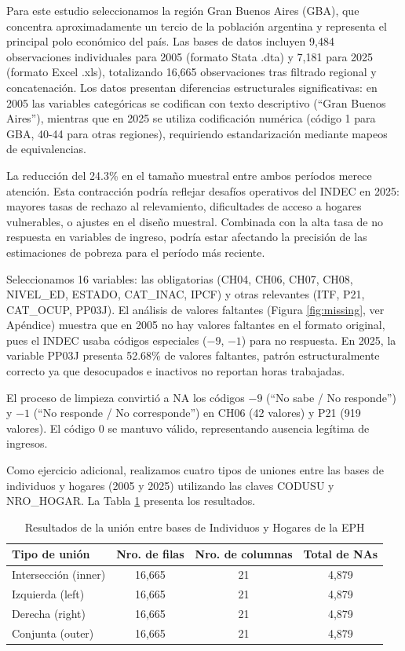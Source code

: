\documentclass[11pt,a4paper]{article}
\begin{document}
Para este estudio seleccionamos la región Gran Buenos Aires (GBA), que concentra aproximadamente un tercio de la población argentina y representa el principal polo económico del país. Las bases de datos incluyen 9,484 observaciones individuales para 2005 (formato Stata .dta) y 7,181 para 2025 (formato Excel .xls), totalizando 16,665 observaciones tras filtrado regional y concatenación. Los datos presentan diferencias estructurales significativas: en 2005 las variables categóricas se codifican con texto descriptivo (``Gran Buenos Aires''), mientras que en 2025 se utiliza codificación numérica (código 1 para GBA, 40-44 para otras regiones), requiriendo estandarización mediante mapeos de equivalencias.

La reducción del 24.3\% en el tamaño muestral entre ambos períodos merece atención. Esta contracción podría reflejar desafíos operativos del INDEC en 2025: mayores tasas de rechazo al relevamiento, dificultades de acceso a hogares vulnerables, o ajustes en el diseño muestral. Combinada con la alta tasa de no respuesta en variables de ingreso, podría estar afectando la precisión de las estimaciones de pobreza para el período más reciente.

Seleccionamos 16 variables: las obligatorias (CH04, CH06, CH07, CH08, NIVEL\_ED, ESTADO, CAT\_INAC, IPCF) y otras relevantes (ITF, P21, CAT\_OCUP, PP03J). El análisis de valores faltantes (Figura \ref{fig:missing}, ver Apéndice) muestra que en 2005 no hay valores faltantes en el formato original, pues el INDEC usaba códigos especiales ($-9$, $-1$) para no respuesta. En 2025, la variable PP03J presenta 52.68\% de valores faltantes, patrón estructuralmente correcto ya que desocupados e inactivos no reportan horas trabajadas.

El proceso de limpieza convirtió a NA los códigos $-9$ (``No sabe / No responde'') y $-1$ (``No responde / No corresponde'') en CH06 (42 valores) y P21 (919 valores). El código 0 se mantuvo válido, representando ausencia legítima de ingresos.

Como ejercicio adicional, realizamos cuatro tipos de uniones entre las bases de individuos y hogares (2005 y 2025) utilizando las claves CODUSU y NRO\_HOGAR. La Tabla \ref{tab:joins} presenta los resultados.

\begin{table}[H]
\centering
\begin{tabular}{lccc}
\toprule
\textbf{Tipo de unión} & \textbf{Nro. de filas} & \textbf{Nro. de columnas} & \textbf{Total de NAs} \\
\midrule
Intersección (inner) & 16,665 & 21 & 4,879 \\
Izquierda (left) & 16,665 & 21 & 4,879 \\
Derecha (right) & 16,665 & 21 & 4,879 \\
Conjunta (outer) & 16,665 & 21 & 4,879 \\
\bottomrule
\end{tabular}
\caption{Resultados de la unión entre bases de Individuos y Hogares de la EPH}
\label{tab:joins}
\end{table}
\end{document}

